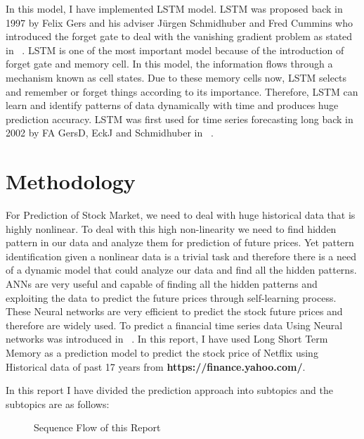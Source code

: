 \documentclass[5p,,preprint,12pt,twocolumn]{elsarticle}
\makeatletter
\def\fixFloatSize#1{}%
\makeatother
\begin{document}
In this model, I have implemented LSTM model. LSTM was proposed back in 1997 by Felix Gers and his adviser J{\"{u}}rgen Schmidhuber and Fred Cummins who introduced the forget gate to deal with the vanishing gradient problem as stated in \unskip~\cite{485690:10916378}. LSTM is one of the most important model because of the introduction of forget gate and memory cell. In this model, the information flows through a mechanism known as cell states. Due to these memory cells now, LSTM selects and remember or forget things according to its importance. Therefore, LSTM can learn and identify patterns of data dynamically with time and produces huge prediction accuracy. LSTM was first used for time series forecasting long back in 2002 by FA GersD, EckJ and Schmidhuber in \unskip~\cite{485690:10916379}.


    
\section{Methodology}
For Prediction of Stock Market, we need to deal with huge historical data that is highly nonlinear. To deal with this high non-linearity we need to find hidden pattern in our data and analyze them for prediction of future prices. Yet pattern identification given a nonlinear data is a trivial task and therefore there is a need of a dynamic model that could analyze our data and find all the hidden patterns. ANNs are very useful and capable of finding all the hidden patterns and exploiting the data to predict the future prices through self-learning process. These Neural networks are very efficient to predict the stock future prices and therefore are widely used. To predict a financial time series data Using Neural networks was introduced in \unskip~\cite{485690:10916380}. In this report, I have used Long Short Term Memory as a prediction model to predict the stock price of Netflix using Historical data of past 17 years from\textbf{ https://finance.yahoo.com/}.

In this report I have divided the prediction approach into subtopics and the subtopics are as follows:
\bgroup
\fixFloatSize{images/2e0b1d07-5a0e-44d4-908a-620610934b50-uscreenshot-439.png}
\begin{figure}[!htbp]
\centering \makeatletter{}
\makeatother 
\caption{{Sequence Flow of this Report}}
\label{f-a0a978df7acf}
\end{figure}
\egroup
\end{document}
